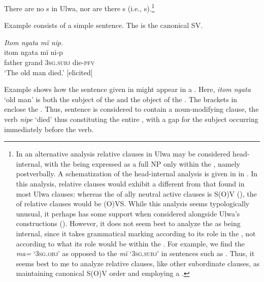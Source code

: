   There are no s in Ulwa, nor are there s (i.e., s).\footnote{In an alternative analysis relative clauses in Ulwa may be considered  head-internal, with the  being expressed as a full NP only within the , namely postverbally. A schematization of the head-internal analysis is given in  in . In this analysis, relative clauses would exhibit a different  from that found in most Ulwa clauses: whereas the  of ally neutral  active clauses is S(O)V (), the  of relative clauses would be (O)VS. While this analysis seems typologically unusual, it perhaps has some support when considered alongside Ulwa’s  constructions (). However, it does not seem best to analyze the  as being internal, since it takes grammatical marking according to its role in the , not according to what its role would be within the . For example, we find the  \textit{ma=} ‘\textsc{3sg.obj}’ as opposed to the  \textit{mï} ‘\textsc{3sg.subj}’ in sentences such as . Thus, it seems best to me to analyze relative clauses, like other subordinate clauses, as maintaining canonical S(O)V order and employing a .}

  Example  consists of a simple  sentence. The  is the canonical SV.

\ea%
    \label{ex:complex:81}
          \textit{Itom ngata mï nip.}\\
\gll    itom  ngata  mï      ni-p\\
    father  grand  \textsc{3sg.subj}  die-\textsc{pfv}\\
\glt `The old man died.’ [elicited]
\z

Example  shows how the sentence given in  might appear in a . Here, \textit{itom ngata} ‘old man’ is both the subject of the  and the object of the . The brackets in  enclose the . Thus, sentence  is considered to contain a noun-modifying clause, the verb \textit{nipe} ‘died’ thus constituting the entire , with a gap for the subject occurring immediately before the verb.

